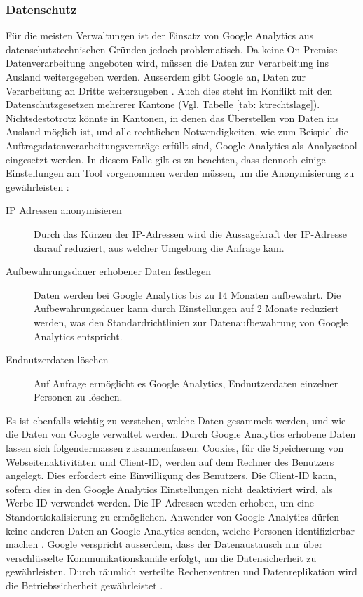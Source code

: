 \subsubsection{Datenschutz}
Für die meisten Verwaltungen ist der Einsatz von Google Analytics aus datenschutztechnischen Gründen jedoch problematisch. Da keine On-Premise Datenverarbeitung angeboten wird, müssen die Daten zur Verarbeitung ins Ausland weitergegeben werden. Ausserdem gibt Google an, Daten zur Verarbeitung an Dritte weiterzugeben \parencite{GoogleInfoSharing}. Auch dies steht im Konflikt mit den Datenschutzgesetzen mehrerer Kantone (Vgl. Tabelle \ref{tab: ktrechtslage}). Nichtsdestotrotz könnte in Kantonen, in denen das Überstellen von Daten ins Ausland möglich ist, und alle rechtlichen Notwendigkeiten, wie zum Beispiel die Auftragsdatenverarbeitungsverträge erfüllt sind, Google Analytics als Analysetool eingesetzt werden. In diesem Falle gilt es zu beachten, dass dennoch einige Einstellungen am Tool vorgenommen werden müssen, um die Anonymisierung zu gewährleisten \parencite{GoogleAnalyticsDatenschutzEinstellungen}: 

\begin{description}
  \item[IP Adressen anonymisieren] Durch das Kürzen der IP-Adressen wird die Aussagekraft der IP-Adresse darauf reduziert, aus welcher Umgebung die Anfrage kam.
  \item[Aufbewahrungsdauer erhobener Daten festlegen] Daten werden bei Google Analytics bis zu 14 Monaten aufbewahrt. Die Aufbewahrungsdauer kann durch Einstellungen auf 2 Monate reduziert werden, was den Standardrichtlinien zur Datenaufbewahrung von Google Analytics entspricht.
  \item[Endnutzerdaten löschen] Auf Anfrage ermöglicht es Google Analytics, Endnutzerdaten einzelner Personen zu löschen.   
\end{description} 

Es ist ebenfalls wichtig zu verstehen, welche Daten gesammelt werden, und wie die Daten von Google verwaltet werden. Durch Google Analytics erhobene Daten lassen sich folgendermassen zusammenfassen: Cookies, für die Speicherung von Webseitenaktivitäten und Client-ID, werden auf dem Rechner des Benutzers angelegt. Dies erfordert eine Einwilligung des Benutzers. Die Client-ID kann, sofern dies in den Google Analytics Einstellungen nicht deaktiviert wird, als Werbe-ID verwendet werden. Die IP-Adressen werden erhoben, um eine Standortlokalisierung zu ermöglichen. Anwender von Google Analytics dürfen keine anderen Daten an Google Analytics senden, welche Personen identifizierbar machen \parencite{GoogleAnalyticsDatenschutz}. Google verspricht ausserdem, dass der Datenaustausch nur über verschlüsselte Kommunikationskanäle erfolgt, um die Datensicherheit zu gewährleisten. Durch räumlich verteilte Rechenzentren und Datenreplikation wird die Betriebssicherheit gewährleistet \parencite{GoogleAnalyticsDatenschutz}.

